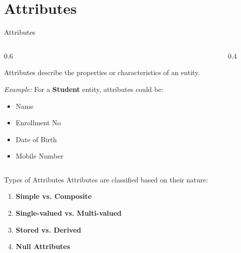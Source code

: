 \documentclass[aspectratio=169, xcolor=dvipsnames]{beamer}
\begin{document}
\section{Attributes}

\begin{frame}{Attributes}
    \begin{columns}
        \begin{column}{0.6\textwidth}
            \begin{definition}
            Attributes describe the properties or characteristics of an entity.
            \end{definition}
            
            \vspace{1em}
            \textit{Example:}
            For a \textbf{Student} entity, attributes could be:
            \begin{itemize}
                \item Name
                \item Enrollment No
                \item Date of Birth
                \item Mobile Number
            \end{itemize}
        \end{column}
        
        \begin{column}{0.4\textwidth}
            \centering
        \end{column}
    \end{columns}
\end{frame}

\begin{frame}{Types of Attributes}
    Attributes are classified based on their nature:
    
    \vspace{1em}
    \begin{enumerate}
        \item \textbf{Simple vs. Composite}
        \item \textbf{Single-valued vs. Multi-valued}
        \item \textbf{Stored vs. Derived}
        \item \textbf{Null Attributes}
    \end{enumerate}
\end{frame}
\end{document}
